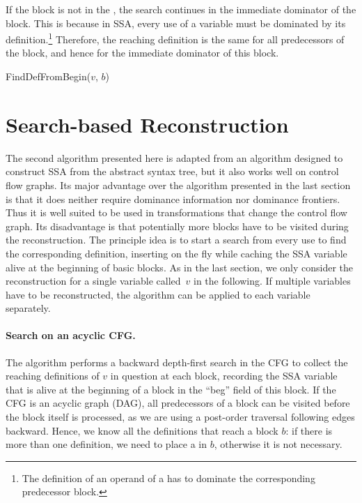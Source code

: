 {If the block is not in the \iDF, the search continues in the immediate dominator of the block. 
This is because in SSA, every use of a variable must be dominated by its definition.\footnote{The definition of an operand of a \phifun has to dominate the corresponding predecessor block.}
Therefore, the reaching definition is the same for all predecessors of the block, and hence for the immediate dominator of this block.

\begin{procedure}
  \caption{FindDefFromBegin($v$, $b$)}
  \label{proc:def-from-end-ssaconstr}
\end{procedure}

\section{Search-based Reconstruction}


The second algorithm presented here is adapted from an algorithm designed to construct SSA from the abstract syntax tree, but it also works well on control flow graphs.
Its major advantage over the algorithm presented in the last section is that it does neither require dominance information nor dominance frontiers.
Thus it is well suited to be used in transformations that change the control flow graph.
Its disadvantage is that potentially more blocks have to be visited during the reconstruction.
The principle idea is to start a search from every use to find the corresponding definition, inserting \phifuns on the fly while caching the SSA variable alive at the beginning of basic blocks.
As in the last section, we only consider the reconstruction for a single variable called~$v$ in the following.
If multiple variables have to be reconstructed, the algorithm can be applied to each variable separately.

\paragraph{Search on an acyclic CFG.}
The algorithm performs a backward depth-first search in the CFG to collect the reaching definitions of $v$ in question at each block,
recording the SSA variable that is alive at the beginning of a block in the ``beg'' field of this block.
If the CFG is an acyclic graph (DAG), all predecessors of a block can be visited before the block itself is processed, as we are using a post-order traversal following edges backward.
Hence, we know all the definitions that reach a block $b$: if there is more than one definition, we need to place a \phifun in $b$, otherwise it is not necessary.

}

